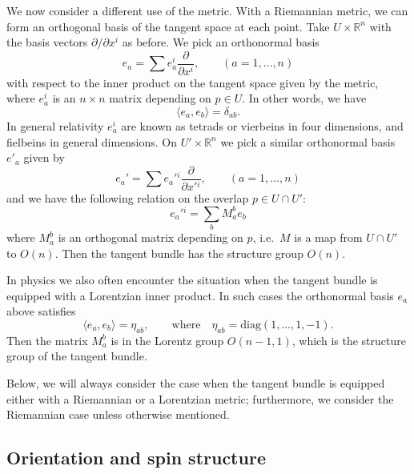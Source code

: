 \documentclass[12pt]{article}
\numberwithin{equation}{section}
\def\bR{\mathbb{R}}
\begin{document}
We now consider a different use of the metric.
With a Riemannian metric, we can form an orthogonal basis of the tangent space at each point.
Take $U\times \bR^n$ with the basis vectors $\partial/\partial x^i$ as before.
We pick an orthonormal basis \begin{equation}
  e_a = \sum e_a^i \frac{\partial}{\partial x^i},
  \qquad (a=1,\ldots,n)
\end{equation} with respect to the inner product on the tangent space given by the metric,
where $e_a^i$ is an $n\times n$ matrix depending on $p\in U$.
In other words, we have \begin{equation}
\langle e_a, e_b \rangle = \delta_{ab}.
\end{equation}
In general relativity $e_a^i$ are known as tetrads or vierbeins 
in four dimensions, and fielbeins in general dimensions.
On $U'\times \bR^n$ we pick a similar orthonormal basis $e'_a$
given by \begin{equation}
  e_a' = \sum e_a'{}^i \frac{\partial}{\partial x'{}^i},
  \qquad (a=1,\ldots,n)
\end{equation}
and we have the following relation on the overlap $p\in U\cap U'$:  \begin{equation}
  e_a'{}^i = \sum_b M_a^b e_b
\end{equation} 
where $M_a^b$ is an orthogonal matrix depending on $p$,
i.e.~$M$ is a map from $U\cap U'$ to $O(n)$.
Then the tangent bundle has the structure group $O(n)$.

In physics we also often encounter the situation
when the tangent bundle is equipped with a Lorentzian inner product.
In such cases the orthonormal basis $e_a$ above satisfies
\begin{equation}
  \langle e_a, e_b \rangle = \eta_{ab},\qquad
  \text{where}
  \quad
  \eta_{ab} = \mathrm{diag}(1,\ldots,1,-1).
\end{equation}
Then the matrix $M_a^b$ is in the Lorentz group $O(n-1,1)$,
which is the structure group of the tangent bundle.

Below, we will always consider the case when the tangent bundle is
equipped either with a Riemannian or a Lorentzian metric;
furthermore, we consider the Riemannian case unless otherwise mentioned.

\subsection{Orientation and spin structure}
\end{document}
